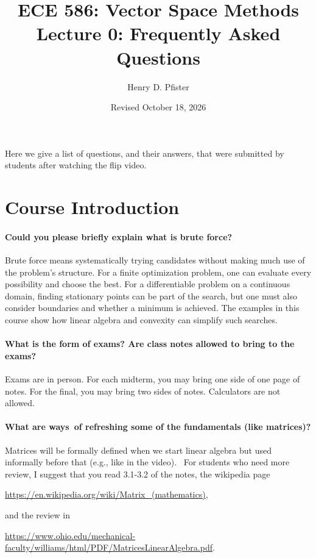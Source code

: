 \documentclass[10pt,english]{article}
\begin{document}
\title{ECE 586: Vector Space Methods \\ Lecture 0: Frequently Asked Questions}
\author{Henry D. Pfister \\ \univ}
\date{Revised October 18, 2026}

\maketitle

Here we give a list of questions, and their answers, that were submitted by students after watching the flip video.

\section{Course Introduction}

\paragraph{Could you please briefly explain what is brute force?}


Brute force means systematically trying candidates without making much use of the problem's structure.
For a finite optimization problem, one can evaluate every possibility and choose the best.
For a differentiable problem on a continuous domain, finding stationary points can be part of the search, but one must also consider boundaries and whether a minimum is achieved.
The examples in this course show how linear algebra and convexity can simplify such searches.


\paragraph{What is the form of exams? Are class notes allowed to bring to the exams?}


Exams are in person. For each midterm, you may bring one side of one page of notes.
For the final, you may bring two sides of notes.
Calculators are not allowed.


\paragraph{What are ways of refreshing some of the fundamentals (like matrices)?}

Matrices will be formally defined when we start linear algebra but used informally before that (e.g., like in the video).  For students who need more review, I suggest that you read 3.1-3.2 of the notes, the wikipedia page
\begin{center}
\url{https://en.wikipedia.org/wiki/Matrix_(mathematics)},
\end{center}
and the review in
\begin{center}
 \url{https://www.ohio.edu/mechanical-faculty/williams/html/PDF/MatricesLinearAlgebra.pdf}.
\end{center}
\end{document}
